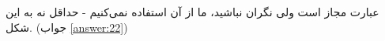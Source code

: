 \section{}
\paragraph{}\label{hint:289}
عبارت  مجاز است ولی نگران نباشید، ما از آن استفاده نمی‌کنیم - حداقل نه به این شکل. (جواب \ref{answer:22})